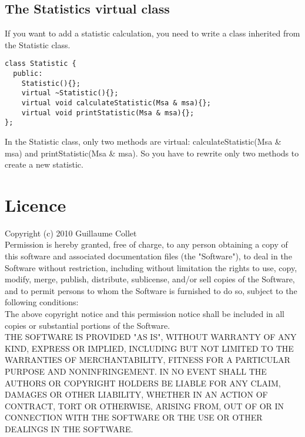 \documentclass[12pt]{report}
\begin{document}
\subsection{The Statistics virtual class}
\label{cla_sec}
If you want to add a statistic calculation, you need to write a class inherited from the Statistic class.
\begin{verbatim}
class Statistic {
  public:
    Statistic(){};
    virtual ~Statistic(){};
    virtual void calculateStatistic(Msa & msa){};
    virtual void printStatistic(Msa & msa){};
};
\end{verbatim}
In the Statistic class, only two methods are virtual: calculateStatistic(Msa \& msa) and printStatistic(Msa \& msa).
So you have to rewrite only two methods to create a new statistic. 




\newpage
\section*{Licence}
Copyright (c) 2010 Guillaume Collet\\
 
Permission is hereby granted, free of charge, to any person obtaining a copy
of this software and associated documentation files (the "Software"), to deal
in the Software without restriction, including without limitation the rights
to use, copy, modify, merge, publish, distribute, sublicense, and/or sell
copies of the Software, and to permit persons to whom the Software is
furnished to do so, subject to the following conditions:\\

The above copyright notice and this permission notice shall be included in
all copies or substantial portions of the Software. \\

THE SOFTWARE IS PROVIDED "AS IS", WITHOUT WARRANTY OF ANY KIND, EXPRESS OR
IMPLIED, INCLUDING BUT NOT LIMITED TO THE WARRANTIES OF MERCHANTABILITY,
FITNESS FOR A PARTICULAR PURPOSE AND NONINFRINGEMENT. IN NO EVENT SHALL THE
AUTHORS OR COPYRIGHT HOLDERS BE LIABLE FOR ANY CLAIM, DAMAGES OR OTHER
LIABILITY, WHETHER IN AN ACTION OF CONTRACT, TORT OR OTHERWISE, ARISING FROM,
OUT OF OR IN CONNECTION WITH THE SOFTWARE OR THE USE OR OTHER DEALINGS IN
THE SOFTWARE. 
\end{document}
